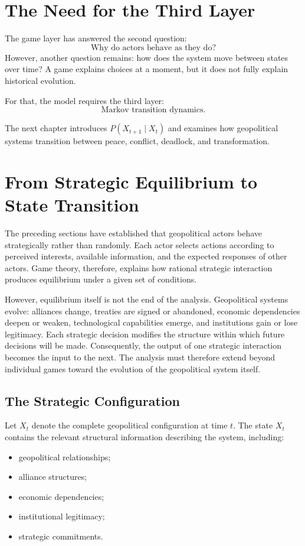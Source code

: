 \documentclass[11pt,openany]{book}
\theoremstyle{plain}
\theoremstyle{definition}
\begin{document}
\section*{The Need for the Third Layer}

The game layer has answered the second question:
\[
\boxed{
\text{Why do actors behave as they do?}
}
\]
However, another question remains: how does the system move between states over time? A game explains choices at a moment, but it does not fully explain historical evolution.

For that, the model requires the third layer:
\[
\boxed{
\text{Markov transition dynamics.}
}
\]

The next chapter introduces \(P(X_{t+1} \mid X_t)\) and examines how geopolitical systems transition between peace, conflict, deadlock, and transformation.

\section{From Strategic Equilibrium to State Transition}

The preceding sections have established that geopolitical actors behave strategically rather than randomly. Each actor selects actions according to perceived interests, available information, and the expected responses of other actors. Game theory, therefore, explains how rational strategic interaction produces equilibrium under a given set of conditions.

However, equilibrium itself is not the end of the analysis. Geopolitical systems evolve: alliances change, treaties are signed or abandoned, economic dependencies deepen or weaken, technological capabilities emerge, and institutions gain or lose legitimacy. Each strategic decision modifies the structure within which future decisions will be made. Consequently, the output of one strategic interaction becomes the input to the next. The analysis must therefore extend beyond individual games toward the evolution of the geopolitical system itself.

\subsection*{The Strategic Configuration}

Let \(X_t\) denote the complete geopolitical configuration at time \(t\). The state \(X_t\) contains the relevant structural information describing the system, including:
\begin{itemize}
    \item geopolitical relationships;
    \item alliance structures;
    \item economic dependencies;
    \item institutional legitimacy;
    \item strategic commitments.
\end{itemize}
\end{document}
